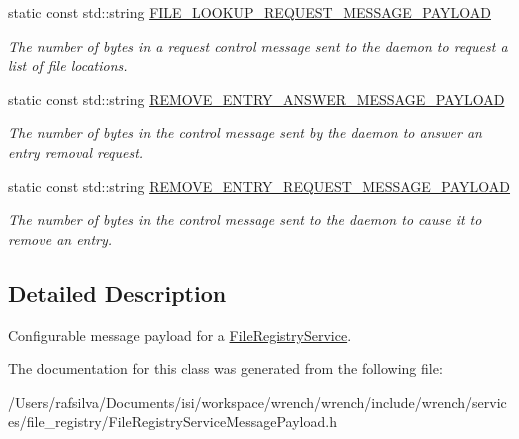 \begin{DoxyCompactItemize}
\mbox{\label{classwrench_1_1_file_registry_service_message_payload_a5f343d2e49893ac12df7f7112ce0fc2e}} 
static const std\+::string \hyperlink{classwrench_1_1_file_registry_service_message_payload_a5f343d2e49893ac12df7f7112ce0fc2e}{F\+I\+L\+E\+\_\+\+L\+O\+O\+K\+U\+P\+\_\+\+R\+E\+Q\+U\+E\+S\+T\+\_\+\+M\+E\+S\+S\+A\+G\+E\+\_\+\+P\+A\+Y\+L\+O\+AD}
\begin{DoxyCompactList}\small\item\em The number of bytes in a request control message sent to the daemon to request a list of file locations. \end{DoxyCompactList}\item 
\mbox{\label{classwrench_1_1_file_registry_service_message_payload_a143ee2e1ad8b0861b040fa67efb17db8}} 
static const std\+::string \hyperlink{classwrench_1_1_file_registry_service_message_payload_a143ee2e1ad8b0861b040fa67efb17db8}{R\+E\+M\+O\+V\+E\+\_\+\+E\+N\+T\+R\+Y\+\_\+\+A\+N\+S\+W\+E\+R\+\_\+\+M\+E\+S\+S\+A\+G\+E\+\_\+\+P\+A\+Y\+L\+O\+AD}
\begin{DoxyCompactList}\small\item\em The number of bytes in the control message sent by the daemon to answer an entry removal request. \end{DoxyCompactList}\item 
\mbox{\label{classwrench_1_1_file_registry_service_message_payload_a1c16af0799b8ba26a3863ca0d253fbf1}} 
static const std\+::string \hyperlink{classwrench_1_1_file_registry_service_message_payload_a1c16af0799b8ba26a3863ca0d253fbf1}{R\+E\+M\+O\+V\+E\+\_\+\+E\+N\+T\+R\+Y\+\_\+\+R\+E\+Q\+U\+E\+S\+T\+\_\+\+M\+E\+S\+S\+A\+G\+E\+\_\+\+P\+A\+Y\+L\+O\+AD}
\begin{DoxyCompactList}\small\item\em The number of bytes in the control message sent to the daemon to cause it to remove an entry. \end{DoxyCompactList}\end{DoxyCompactItemize}


\subsection{Detailed Description}
Configurable message payload for a \hyperlink{classwrench_1_1_file_registry_service}{File\+Registry\+Service}. 

The documentation for this class was generated from the following file\+:\begin{DoxyCompactItemize}
\item 
/\+Users/rafsilva/\+Documents/isi/workspace/wrench/wrench/include/wrench/services/file\+\_\+registry/File\+Registry\+Service\+Message\+Payload.\+h\end{DoxyCompactItemize}
